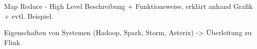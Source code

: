 Map Reduce - High Level Beschreibung + Funktionsweise, erklärt anhand Grafik + evtl. Beispiel.

Eigenschaften von Systemen (Hadoop, Spark, Storm, Asterix) -> Überleitung zu Flink


